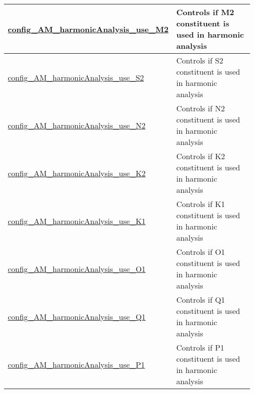 {\begin{center}
\begin{longtable}{| p{2.0in} || p{4.0in} |}
    \hyperref[subsec:nm_sec_config_AM_harmonicAnalysis_use_M2]{config\_AM\_harmonicAnalysis\_\-use\_M2} & Controls if M2 constituent is used in harmonic analysis \\
    \hline
    \hyperref[subsec:nm_sec_config_AM_harmonicAnalysis_use_S2]{config\_AM\_harmonicAnalysis\_\-use\_S2} & Controls if S2 constituent is used in harmonic analysis \\
    \hline
    \hyperref[subsec:nm_sec_config_AM_harmonicAnalysis_use_N2]{config\_AM\_harmonicAnalysis\_\-use\_N2} & Controls if N2 constituent is used in harmonic analysis \\
    \hline
    \hyperref[subsec:nm_sec_config_AM_harmonicAnalysis_use_K2]{config\_AM\_harmonicAnalysis\_\-use\_K2} & Controls if K2 constituent is used in harmonic analysis \\
    \hline
    \hyperref[subsec:nm_sec_config_AM_harmonicAnalysis_use_K1]{config\_AM\_harmonicAnalysis\_\-use\_K1} & Controls if K1 constituent is used in harmonic analysis \\
    \hline
    \hyperref[subsec:nm_sec_config_AM_harmonicAnalysis_use_O1]{config\_AM\_harmonicAnalysis\_\-use\_O1} & Controls if O1 constituent is used in harmonic analysis \\
    \hline
    \hyperref[subsec:nm_sec_config_AM_harmonicAnalysis_use_Q1]{config\_AM\_harmonicAnalysis\_\-use\_Q1} & Controls if Q1 constituent is used in harmonic analysis \\
    \hline
    \hyperref[subsec:nm_sec_config_AM_harmonicAnalysis_use_P1]{config\_AM\_harmonicAnalysis\_\-use\_P1} & Controls if P1 constituent is used in harmonic analysis \\
    \hline
\end{longtable}
\end{center}
}
